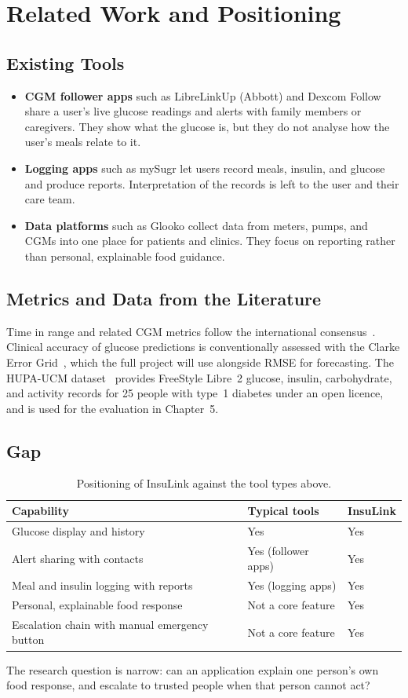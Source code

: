 \chapter{Related Work and Positioning}

\section{Existing Tools}
\begin{itemize}
  \item \textbf{CGM follower apps} such as LibreLinkUp (Abbott) and Dexcom Follow share a user's live glucose readings and alerts with family members or caregivers. They show what the glucose is, but they do not analyse how the user's meals relate to it.
  \item \textbf{Logging apps} such as mySugr let users record meals, insulin, and glucose and produce reports. Interpretation of the records is left to the user and their care team.
  \item \textbf{Data platforms} such as Glooko collect data from meters, pumps, and CGMs into one place for patients and clinics. They focus on reporting rather than personal, explainable food guidance.
\end{itemize}

\section{Metrics and Data from the Literature}
Time in range and related CGM metrics follow the international consensus~\cite{battelino2019}. Clinical accuracy of glucose predictions is conventionally assessed with the Clarke Error Grid~\cite{clarke1987}, which the full project will use alongside RMSE for forecasting. The HUPA-UCM dataset~\cite{hupa2024} provides FreeStyle Libre~2 glucose, insulin, carbohydrate, and activity records for 25 people with type~1 diabetes under an open licence, and is used for the evaluation in Chapter~5.

\section{Gap}
\begin{table}[h]
\centering
\begin{tabularx}{\textwidth}{Xll}
\hline
Capability & Typical tools & InsuLink \\
\hline
Glucose display and history & Yes & Yes \\
Alert sharing with contacts & Yes (follower apps) & Yes \\
Meal and insulin logging with reports & Yes (logging apps) & Yes \\
Personal, explainable food response & Not a core feature & Yes \\
Escalation chain with manual emergency button & Not a core feature & Yes \\
\hline
\end{tabularx}
\caption{Positioning of InsuLink against the tool types above.}
\end{table}

The research question is narrow: can an application explain one person's own food response, and escalate to trusted people when that person cannot act?
